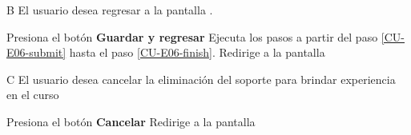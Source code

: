\begin{UCtrayectoriaA}{B}{%
El usuario desea regresar a la pantalla .}

  \Actor Presiona el botón {\bf Guardar y regresar}
  \Sistema Ejecuta los pasos a partir del paso \ref{CU-E06-submit} hasta el
           paso \ref{CU-E06-finish}.
  \Sistema Redirige a la pantalla 

\end{UCtrayectoriaA}

\begin{UCtrayectoriaA}{C}{%
El usuario desea cancelar la eliminación del soporte para brindar experiencia en el curso}

  \Actor Presiona el botón {\bf Cancelar}
  \Sistema Redirige a la pantalla 

\end{UCtrayectoriaA}
